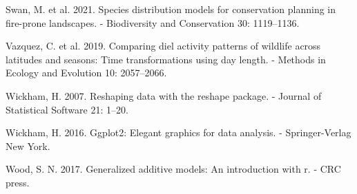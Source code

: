 \documentclass[]{elsarticle} %
\begin{document}
\leavevmode\hypertarget{ref-swan2021species}{}%
Swan, M. et al. 2021. Species distribution models for conservation planning in fire-prone landscapes. - Biodiversity and Conservation 30: 1119--1136.

\leavevmode\hypertarget{ref-https:ux2fux2fdoi.orgux2f10.1111ux2f2041-210X.13290}{}%
Vazquez, C. et al. 2019. Comparing diel activity patterns of wildlife across latitudes and seasons: Time transformations using day length. - Methods in Ecology and Evolution 10: 2057--2066.

\leavevmode\hypertarget{ref-reshape}{}%
Wickham, H. 2007. Reshaping data with the reshape package. - Journal of Statistical Software 21: 1--20.

\leavevmode\hypertarget{ref-ggplot2}{}%
Wickham, H. 2016. Ggplot2: Elegant graphics for data analysis. - Springer-Verlag New York.

\leavevmode\hypertarget{ref-wood2017}{}%
Wood, S. N. 2017. Generalized additive models: An introduction with r. - CRC press.
\end{document}
